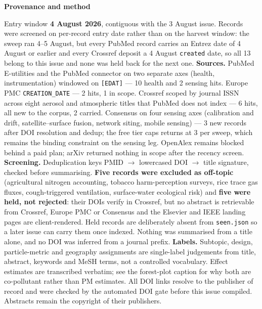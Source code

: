 \documentclass[10pt]{article}
\begin{document}
\vspace{4mm}
\begin{keybox}
{\sffamily\bfseries\footnotesize\color{Deep}Provenance and method}\\[1.2mm]
{\fontsize{7.2}{8.8}\selectfont
Entry window \textbf{4 August 2026}, contiguous with the 3 August issue. Records were
screened on per-record entry date rather than on the harvest window: the sweep ran
4--5 August, but every PubMed record carries an Entrez date of 4 August or earlier and
every Crossref deposit a 4 August \texttt{created} date, so all 13 belong to this issue
and none was held back for the next one.
\textbf{Sources.} PubMed E-utilities and the PubMed connector on two separate axes
(health, instrumentation) windowed on \texttt{[EDAT]} --- 10 health and 2 sensing hits.
Europe PMC \texttt{CREATION\_DATE} --- 2 hits, 1 in scope. Crossref scoped by journal ISSN
across eight aerosol and atmospheric titles that PubMed does not index --- 6 hits, all new
to the corpus, 2 carried. Consensus on four sensing axes (calibration and drift,
satellite--surface fusion, network siting, mobile sensing) --- 3 new records after DOI
resolution and dedup; the free tier caps returns at 3 per sweep, which remains the binding
constraint on the sensing leg. OpenAlex remains blocked behind a paid plan; arXiv
returned nothing in scope after the recency screen.
\textbf{Screening.} Deduplication keys PMID $\rightarrow$ lowercased DOI $\rightarrow$
title signature, checked before summarising. \textbf{Five records were excluded as
off-topic} (agricultural nitrogen accounting, tobacco harm-perception surveys, rice trace
gas fluxes, cough-triggered ventilation, surface-water ecological risk) and \textbf{five
were held, not rejected}: their DOIs verify in Crossref, but no abstract is retrievable
from Crossref, Europe PMC or Consensus and the Elsevier and IEEE landing pages are
client-rendered. Held records are deliberately absent from \texttt{seen.json} so a later
issue can carry them once indexed. Nothing was summarised from a title alone, and no DOI
was inferred from a journal prefix.
\textbf{Labels.} Subtopic, design, particle-metric and geography assignments are
single-label judgements from title, abstract, keywords and MeSH terms, not a controlled
vocabulary. Effect estimates are transcribed verbatim; see the forest-plot caption for
why both are co-pollutant rather than PM estimates.
All DOI links resolve to the publisher of record and were checked by the automated DOI
gate before this issue compiled. Abstracts remain the copyright of their publishers.\par}
\end{keybox}
\end{document}
